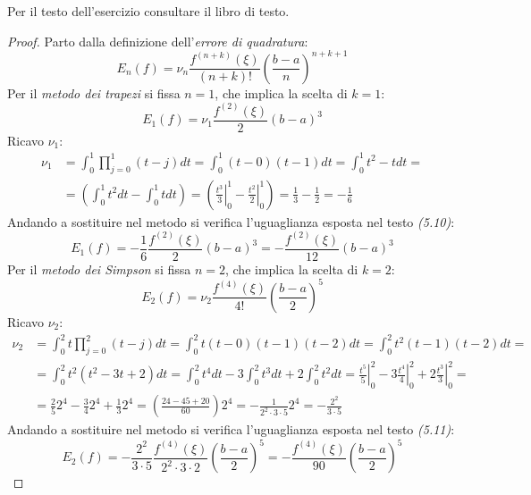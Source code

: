\begin{exercise}[5.3] 
Per il testo dell'esercizio consultare il libro di testo.
\end{exercise}
\begin{proof}
Parto dalla definizione dell'\emph{errore di quadratura}:
\begin{displaymath}
E_{n}(f) =
\nu_{n}\frac{f^{(n+k)}(\xi)}{(n+k)!}\left(\frac{b-a}{n}\right)^{n+k+1}
\end{displaymath}
Per il \emph{metodo dei trapezi} si fissa $n = 1$, che implica la scelta di $k
= 1$:
\begin{displaymath}
E_{1}(f) =
\nu_{1}\frac{f^{(2)}(\xi)}{2}\left(b-a\right)^{3}
\end{displaymath}
Ricavo $\nu_{1}$:
\begin{displaymath}
\begin{split}
\nu_{1} &= \int_{0}^{1}{\prod_{j=0}^{1}{(t-j)dt}} = 
\int_{0}^{1}{(t-0)(t-1)dt} = \int_{0}^{1}{t^{2}
-t dt} = \\ 
&= \left(\int_{0}^{1}{t^{2} dt} - \int_{0}^{1}{t dt}\right) = 
\left(\left.\frac{t^{3}}{3}\right |_{0}^{1} - \left.\frac{t^{2}}{2}
\right |_{0}^{1}\right) = \frac{1}{3} - \frac{1}{2} = -\frac{1}{6} 
\end{split}
\end{displaymath}
Andando a sostituire nel metodo si verifica l'uguaglianza esposta nel testo
\emph{(5.10)}:
\begin{displaymath}
E_{1}(f) =
-\frac{1}{6}\frac{f^{(2)}(\xi)}{2}\left(b-a\right)^{3} =
-\frac{f^{(2)}(\xi)}{12}\left(b-a\right)^{3}
\end{displaymath}
Per il \emph{metodo dei Simpson} si fissa $n = 2$, che implica la scelta di $k
= 2$:
\begin{displaymath}
E_{2}(f) =
\nu_{2}\frac{f^{(4)}(\xi)}{4!}\left(\frac{b-a}{2}\right)^{5}
\end{displaymath} 
Ricavo $\nu_{2}$:
\begin{displaymath}
\begin{split}
\nu_{2} &= \int_{0}^{2}{t \prod_{j=0}^{2}{(t-j)dt}} = 
\int_{0}^{2}{t(t-0)(t-1)(t-2)dt} = \int_{0}^{2}{t^{2}(t-1)(t-2)dt} = \\
&= \int_{0}^{2}{t^{2}(t^{2}-3t+2)dt} = 
\int_{0}^{2}{t^{4}dt} -3\int_{0}^{2}{t^{3}dt} +2\int_{0}^{2}{t^{2}dt} = 
\left.\frac{t^{5}}{5}\right |_{0}^{2} - 3\left.\frac{t^{4}}{4}\right |_{0}^{2} +
2 \left.\frac{t^{3}}{3}\right |_{0}^{2} = \\
&= \frac{2}{5}2^{4} -\frac{3}{4}2^{4} + \frac{1}{3}2^{4} =
\left(\frac{24-45+20}{60}\right)2^{4} = -\frac{1}{2^{2}\cdot 3 \cdot 5}2^{4} =
-\frac{2^{2}}{3\cdot 5}
\end{split}
\end{displaymath}
Andando a sostituire nel metodo si verifica l'uguaglianza esposta nel testo
\emph{(5.11)}:
\begin{displaymath}
E_{2}(f) =
-\frac{2^{2}}{3\cdot 5}\frac{f^{(4)}(\xi)}{2^{2} \cdot
3 \cdot 2}\left(\frac{b-a}{2}\right)^{5} =
-\frac{f^{(4)}(\xi)}{90}\left(\frac{b-a}{2}\right)^{5}
\end{displaymath}
\end{proof}


